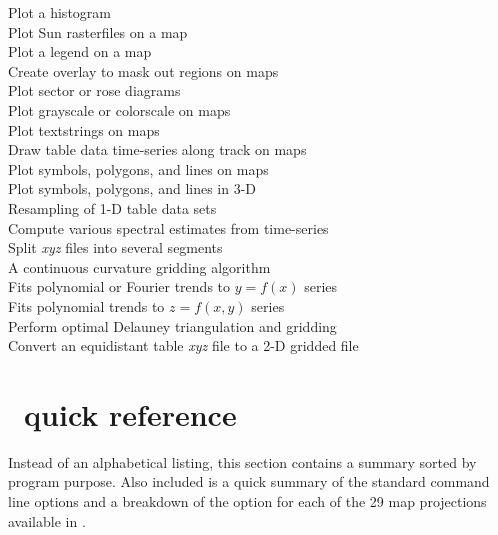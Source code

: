 \begin{tabbing}
	\>	Plot a histogram \\ 
	\>	Plot Sun rasterfiles on a map \\ 
	\>	Plot a legend on a map \\ 
	\>	Create overlay to mask out regions on maps \\ 
	\>	Plot sector or rose diagrams \\ 
	\>	Plot grayscale or colorscale on maps \\ 
	\>	Plot textstrings on maps \\ 
	\>	Draw table data time-series along track on maps \\ 
		\>	Plot symbols, polygons, and lines on maps \\ 
		\>	Plot symbols, polygons, and lines in 3-D \\ 
	\>	Resampling of 1-D table data sets \\ 
	\>	Compute various spectral estimates from time-series \\ 
	\>	Split {\it xyz} files into several segments \\ 
	\>	A continuous curvature gridding algorithm \\ 
	\>	Fits polynomial or Fourier trends to $y = f(x)$ series \\ 
	\>	Fits polynomial trends to $z = f(x,y)$ series \\ 
	\>	Perform optimal Delauney triangulation and gridding \\ 
	\>	Convert an equidistant table {\it xyz} file to a 2-D gridded file
\end{tabbing}

\section{\gmt\ quick reference}
\label{sec:purpose}
Instead of an alphabetical listing, this section contains a summary
sorted by program purpose.  Also included is a quick summary of the
standard command line options and a breakdown of the  option
for each of the 29 map projections available in \GMT. \\

